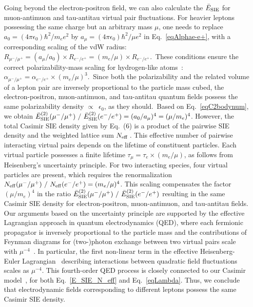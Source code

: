 \documentclass[aps,prl,twocolumn,showpacs,groupaddress]{revtex4-1}
\newcommand{\rrr}[1]{{\color{black}#1}}
\newcommand{\bbb}[1]{{\color{black}#1}}
\begin{document}
\bbb{Going beyond the electron-positron field, we can also calculate the
$\bar{E}_{\rm SIE}$ for muon-antimuon and tau-antitau \rrr{virtual pair} fluctuations.}
\rrr{For heavier leptons possessing the same charge but an arbitrary mass $\mu$, one needs to replace $a_0 = (4\pi\epsilon_0)\hbar^2/m_e e^2$ by $a_{\mu} = (4\pi\epsilon_0)\hbar^2/\mu e^2$ in Eq.~\eqref{eqAlphae-e+}, with a corresponding scaling of the vdW radius: $R_{\mu^-/\mu^+} = (a_{\mu}/a_0)\times R_{e^-/e^+} = (m_e/\mu)\times R_{e^-/e^+}$.~These conditions ensure the correct polarizability-mass scaling for hydrogen-like atoms~\cite{L4}:~$\alpha_{\mu^-/\mu^+} = \alpha_{e^-/e^+} \times (m_e /\mu)^3$.~Since both the polarizability and the related volume of a lepton pair are inversely proportional to the particle mass cubed, the electron-positron, muon-antimuon, and tau-antitau quantum fields possess the same polarizability density $\propto$~$\epsilon_0$, as they should.~Based on Eq.~\eqref{eqC2bodynum}, we obtain $\bar{E}_{\rm SIE}^{(2)} (\mu^-/\mu^+)~/~\bar{E}_{\rm SIE}^{(2)} (e^-/e^+) = (a_0/a_{\mu})^4 = (\mu/m_e)^4$.
However, the total Casimir SIE density given by Eq.~(6) is a product of the pairwise SIE density and the weighted lattice sum $N_{\rm eff}\,$. This effective number of pairwise interacting virtual pairs depends on the lifetime of constituent particles.
Each virtual particle possesses a finite lifetime $\tau_{\mu} = \tau_e \times (m_e/\mu)$, as follows from Heisenberg's uncertainty principle. For two interacting species, four virtual particles are present, which requires the renormalization $N_{\rm eff} (\mu^-/\mu^+)~/~N_{\rm eff} (e^-/e^+) = (m_e/\mu)^4$. This scaling compensates the factor $(\mu/m_e)^4$ in the ratio $\bar{E}_{\rm SIE}^{(2)} (\mu^-/\mu^+)~/~\bar{E}_{\rm SIE}^{(2)} (e^-/e^+)$ resulting in the same Casimir SIE density for electron-positron, muon-antimuon, and tau-antitau fields. Our arguments based on the uncertainty principle are supported by the effective Lagrangian approach in quantum electrodynamics (QED), where each fermionic propagator is inversely proportional to the particle mass and the contributions of Feynman diagrams for (two-)photon exchange between two virtual pairs scale with $\mu^{-4}$~\cite{Greiner-book}. In particular, the first non-linear term in the effective Heisenberg-Euler Lagrangian~\cite{Greiner-book,Schwinger,Dittrich} describing interactions between quadratic field fluctuations scales as $\mu^{-4}$. This fourth-order QED process is closely connected to our Casimir model~\cite{Reza_PRR,CraigThirunamachandran-book,Salam-book}, for both Eq.~\eqref{E_SIE_N_eff} and Eq.~\eqref{eqLambda}. Thus, we conclude that electrodynamic fields corresponding to different leptons possess the same Casimir SIE density.}
\end{document}
